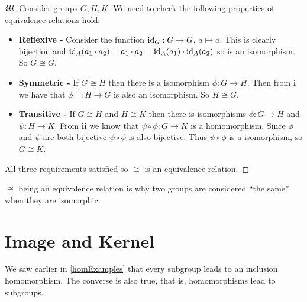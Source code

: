 \documentclass[../main.tex]{subfiles}
\begin{document}
\begin{proof}[\textbf{iii}]
  Consider groups $G, H, K$.
  We need to check the following properties of equivalence relations hold:
  \begin{itemize}
    \item \textbf{Reflexive -} Consider the function $\mathrm{id}_G: G \to G$, $a \mapsto a$.
      This is clearly bijection and $\mathrm{id}_A(a_1 \cdot a_2) = a_1 \cdot a_2 = \mathrm{id}_A(a_1) \cdot \mathrm{id}_A(a_2)$ so is an isomorphism.
      So $G \cong G$.
    \item \textbf{Symmetric -} If $G \cong H$ then there is a isomorphism $\phi: G \to H$.
      Then from \textbf{i} we have that $\phi^{-1}: H \to G$ is also an isomorphism.
      So $H \cong G$.
    \item \textbf{Transitive -} If $G \cong H$ and $H \cong K$ then there is isomorphisms $\phi: G \to H$ and $\psi: H \to K$.
      From \textbf{ii} we know that $\psi \circ \phi: G \to K$ is a homomorphism.
      Since $\phi$ and $\psi$ are both bijective $\psi \circ \phi$ is also bijective.
      Thus $\psi \circ \phi$ is a isomorphism, so $G \cong K$.
  \end{itemize}
  All three requirements satisfied so $\cong$ is an equivalence relation.
\end{proof}
\begin{remark}
  $\cong$ being an equivalence relation is why two groups are considered ``the same'' when they are isomorphic.
\end{remark}
\section{Image and Kernel}
We saw earlier in \cref{homExamples} that every subgroup leads to an inclusion homomorphism.
The converse is also true, that is, homomorphisms lead to subgroups.
\end{document}

